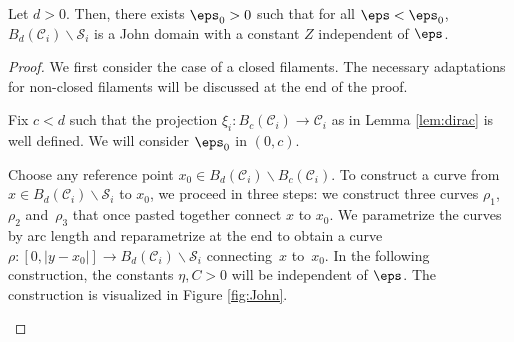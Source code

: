 \begin{Lemma} \label{nioul}
Let $d>0$. Then, there exists $\eps_0 >0$ such that for all $\eps < \eps_0$, $B_d(\mathcal C_i) \smallsetminus \mathcal S_i$ is a John domain with a constant $Z$ independent of $\eps$.
\end{Lemma}
\begin{proof}
We first consider the case of a closed filaments. The necessary adaptations for non-closed filaments will be discussed at the end of the proof.

Fix $c < d$ such that the projection $\xi_i \colon B_{c}(\mathcal C_i) \to \mathcal C_i$ as in Lemma \ref{lem:dirac} is well defined. We will consider $\eps_0 $ in $(0, c)$.

Choose any reference point $x_0 \in B_d(\mathcal C_i) \smallsetminus B_{c}(\mathcal C_i)$.
To construct a curve from $x \in B_d(\mathcal C_i) \smallsetminus \mathcal S_i$ to $x_0$, we proceed in three steps{: we construct} three curves $\rho_1$, $\rho_2$ and~$\rho_3$ that {once pasted} together connect $x$ to $x_0$. We parametrize the curves by arc length and reparametrize at the end to obtain a curve $\rho \colon [0,|y-x_0|] \to B_d(\mathcal C_i) \smallsetminus \mathcal S_i$ connecting~$x$ to~$x_0$. In the following construction, the constants $\eta, C>0$ will be independent of $\eps$. The construction is visualized in Figure \ref{fig:John}.

\begin{figure}

\centering

\end{figure}
\end{proof}
